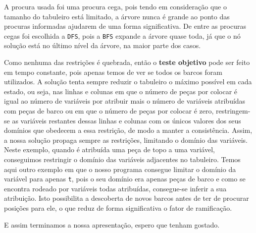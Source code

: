 \documentclass[12pt,a4paper]{article}
\begin{document}
A procura usada foi uma procura cega, pois tendo em consideração que o tamanho do tabuleiro está limitado, a árvore nunca é grande
ao ponto das procuras informadas ajudarem de uma forma significativa. De entre as procuras cegas foi escolhida a \texttt{DFS}, pois a \texttt{BFS}
expande a árvore quase toda, já que o nó solução está no último nível da árvore, na maior parte dos casos.

Como nenhuma das restrições é quebrada, então o \textbf{teste objetivo} pode ser feito em tempo constante, pois apenas temos de ver se todos
os barcos foram utilizados.
A solução tenta sempre reduzir o tabuleiro o máximo possível em cada estado, ou seja, nas linhas e colunas em que o número de peças por colocar
é igual ao número de variáveis por atribuir mais o número de variáveis atribuídas com peças de barco ou em que o número de peças por colocar é zero,
restringem-se as variáveis restantes dessas linhas e colunas com os únicos valores dos seus domínios que obedecem a essa restrição, de modo a manter a consistência.
Assim, a nossa solução propaga sempre as restrições, limitando o domínio das variáveis. Neste exemplo, quando é atribuída uma peça de topo a uma variável,
conseguimos restringir o domínio das variáveis adjacentes no tabuleiro.
Temos aqui outro exemplo em que o nosso programa consegue limitar o domínio da variável para apenas \texttt{t}, pois o seu domínio era apenas
peças de barco e como se encontra rodeado por variáveis todas atribuídas, consegue-se inferir a sua atribuição.
Isto possibilita a descoberta de novos barcos antes de ter de procurar posições para ele, o que reduz de forma significativa o fator de ramificação.

E assim terminamos a nossa apresentação, espero que tenham gostado. \smiley{}
\end{document}
